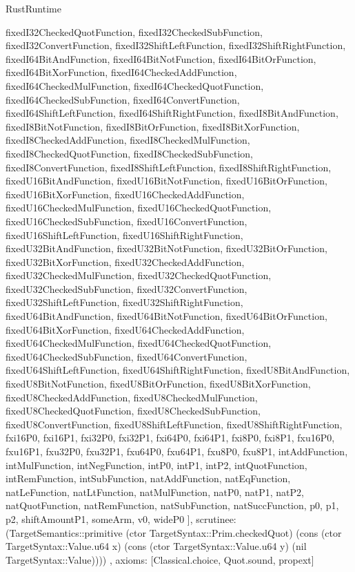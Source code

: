 \begin{lexlean}{RustRuntime}
\begin{semanticmodule}
{{      fixedI32CheckedQuotFunction,
      fixedI32CheckedSubFunction,
      fixedI32ConvertFunction,
      fixedI32ShiftLeftFunction,
      fixedI32ShiftRightFunction,
      fixedI64BitAndFunction,
      fixedI64BitNotFunction,
      fixedI64BitOrFunction,
      fixedI64BitXorFunction,
      fixedI64CheckedAddFunction,
      fixedI64CheckedMulFunction,
      fixedI64CheckedQuotFunction,
      fixedI64CheckedSubFunction,
      fixedI64ConvertFunction,
      fixedI64ShiftLeftFunction,
      fixedI64ShiftRightFunction,
      fixedI8BitAndFunction,
      fixedI8BitNotFunction,
      fixedI8BitOrFunction,
      fixedI8BitXorFunction,
      fixedI8CheckedAddFunction,
      fixedI8CheckedMulFunction,
      fixedI8CheckedQuotFunction,
      fixedI8CheckedSubFunction,
      fixedI8ConvertFunction,
      fixedI8ShiftLeftFunction,
      fixedI8ShiftRightFunction,
      fixedU16BitAndFunction,
      fixedU16BitNotFunction,
      fixedU16BitOrFunction,
      fixedU16BitXorFunction,
      fixedU16CheckedAddFunction,
      fixedU16CheckedMulFunction,
      fixedU16CheckedQuotFunction,
      fixedU16CheckedSubFunction,
      fixedU16ConvertFunction,
      fixedU16ShiftLeftFunction,
      fixedU16ShiftRightFunction,
      fixedU32BitAndFunction,
      fixedU32BitNotFunction,
      fixedU32BitOrFunction,
      fixedU32BitXorFunction,
      fixedU32CheckedAddFunction,
      fixedU32CheckedMulFunction,
      fixedU32CheckedQuotFunction,
      fixedU32CheckedSubFunction,
      fixedU32ConvertFunction,
      fixedU32ShiftLeftFunction,
      fixedU32ShiftRightFunction,
      fixedU64BitAndFunction,
      fixedU64BitNotFunction,
      fixedU64BitOrFunction,
      fixedU64BitXorFunction,
      fixedU64CheckedAddFunction,
      fixedU64CheckedMulFunction,
      fixedU64CheckedQuotFunction,
      fixedU64CheckedSubFunction,
      fixedU64ConvertFunction,
      fixedU64ShiftLeftFunction,
      fixedU64ShiftRightFunction,
      fixedU8BitAndFunction,
      fixedU8BitNotFunction,
      fixedU8BitOrFunction,
      fixedU8BitXorFunction,
      fixedU8CheckedAddFunction,
      fixedU8CheckedMulFunction,
      fixedU8CheckedQuotFunction,
      fixedU8CheckedSubFunction,
      fixedU8ConvertFunction,
      fixedU8ShiftLeftFunction,
      fixedU8ShiftRightFunction,
      fxi16P0,
      fxi16P1,
      fxi32P0,
      fxi32P1,
      fxi64P0,
      fxi64P1,
      fxi8P0,
      fxi8P1,
      fxu16P0,
      fxu16P1,
      fxu32P0,
      fxu32P1,
      fxu64P0,
      fxu64P1,
      fxu8P0,
      fxu8P1,
      intAddFunction,
      intMulFunction,
      intNegFunction,
      intP0,
      intP1,
      intP2,
      intQuotFunction,
      intRemFunction,
      intSubFunction,
      natAddFunction,
      natEqFunction,
      natLeFunction,
      natLtFunction,
      natMulFunction,
      natP0,
      natP1,
      natP2,
      natQuotFunction,
      natRemFunction,
      natSubFunction,
      natSuccFunction,
      p0,
      p1,
      p2,
      shiftAmountP1,
      someArm,
      v0,
      wideP0
    ],
    scrutinee: (TargetSemantics::primitive (ctor TargetSyntax::Prim.checkedQuot) (cons (ctor TargetSyntax::Value.u64 x) (cons (ctor TargetSyntax::Value.u64 y) (nil TargetSyntax::Value))))
  },
  axioms: [Classical.choice, Quot.sound, propext]
}


\end{semanticmodule}
\end{lexlean}
